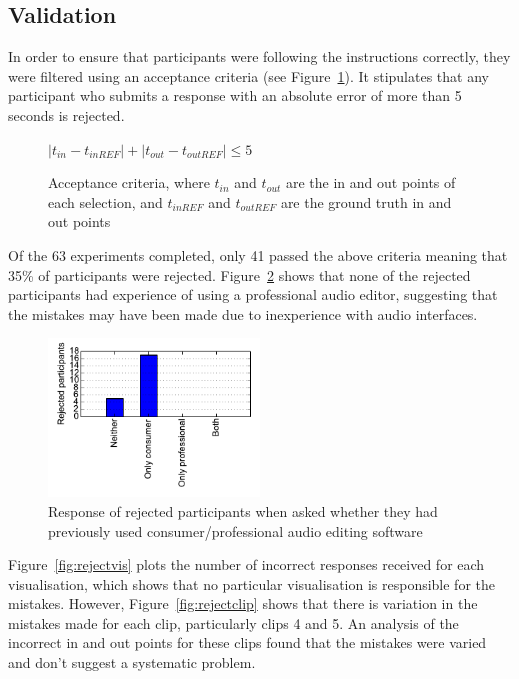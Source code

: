 \subsection{Validation}
In order to ensure that participants were following the instructions correctly,
they were filtered using an acceptance criteria (see Figure~\ref{eq:accept}).
It stipulates that any participant who submits a response with an absolute
error of more than 5 seconds is rejected.

\begin{figure}[ht]
  \begin{center}
    $ |t_{in}-t_{inREF}| + |t_{out}-t_{outREF}| \leq 5 $
  \end{center}
  \caption{Acceptance criteria, where $t_{in}$ and $t_{out}$ are the in and out
    points of each selection, and $t_{inREF}$ and $t_{outREF}$ are the ground
    truth in and out points}
  \label{eq:accept}
\end{figure}

Of the 63 experiments completed, only 41 passed the above criteria meaning that
35\% of participants were rejected. Figure~\ref{fig:rejectdaw} shows that none
of the rejected participants had experience of using a professional audio
editor, suggesting that the mistakes may have been made due to inexperience
with audio interfaces.

\begin{figure}[ht]
  \centering
  \includegraphics[width=0.5\textwidth]{figs/reject-daw.pdf}
  \caption{Response of rejected participants when asked whether they had
    previously used consumer/professional audio editing software}
  \label{fig:rejectdaw}
\end{figure}

Figure~\ref{fig:rejectvis} plots the number of incorrect responses received for
each visualisation, which shows that no particular visualisation is responsible
for the mistakes. However, Figure~\ref{fig:rejectclip} shows that there is
variation in the mistakes made for each clip, particularly clips 4 and 5. An
analysis of the incorrect in and out points for these clips found that
the mistakes were varied and don't suggest a systematic problem. 

